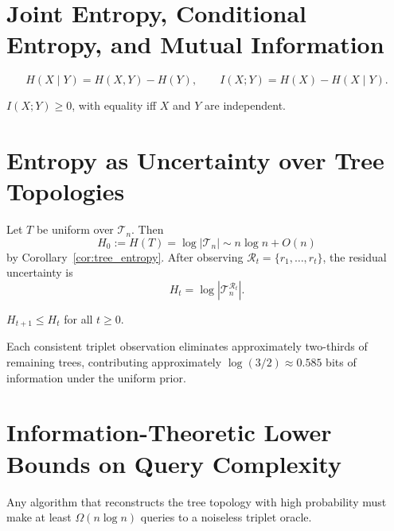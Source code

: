 \section{Joint Entropy, Conditional Entropy, and Mutual Information}

\begin{definition}
\[
H(X \mid Y) = H(X, Y) - H(Y), \qquad I(X; Y) = H(X) - H(X \mid Y).
\]
\end{definition}

\begin{proposition}
$I(X;Y) \geq 0$, with equality iff $X$ and $Y$ are independent.
\end{proposition}

\section{Entropy as Uncertainty over Tree Topologies}

Let $T$ be uniform over $\mathcal{T}_n$. Then
\[
H_0 := H(T) = \log |\mathcal{T}_n| \sim n \log n + O(n)
\]
by Corollary~\ref{cor:tree_entropy}. After observing $\mathcal{R}_t = \{r_1,\ldots,r_t\}$, the residual uncertainty is
\[
H_t = \log |\mathcal{T}_n^{\mathcal{R}_t}|.
\]

\begin{proposition}
\label{prop:entropy_descent}
$H_{t+1} \leq H_t$ for all $t \geq 0$.
\end{proposition}

\begin{proposition}
\label{prop:info_per_triplet}
Each consistent triplet observation eliminates approximately two-thirds of remaining trees, contributing approximately $\log(3/2) \approx 0.585$ bits of information under the uniform prior.
\end{proposition}

\section{Information-Theoretic Lower Bounds on Query Complexity}

\begin{theorem}
\label{thm:query_lower_bound}
Any algorithm that reconstructs the tree topology with high probability must make at least $\Omega(n \log n)$ queries to a noiseless triplet oracle.
\end{theorem}

